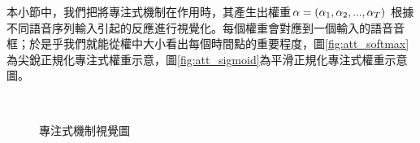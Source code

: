 \begin{itemize}
本小節中，我們把將專注式機制在作用時，其產生出權重$\bold{\alpha} =(
\alpha_1,\alpha_2,...,\alpha_T)$
根據不同語音序列輸入引起的反應進行視覺化。每個權重會對應到一個輸入的語音音框；於是乎我們就能從權中大小看出每個時間點的重要程度，圖\ref{fig:att_softmax}為尖銳正規化專注式權重示意，圖\ref{fig:att_sigmoid}為平滑正規化專注式權重示意圖。
\begin{figure}[h]
\centering
{}
\\
\caption{專注式機制視覺圖}
\end{figure}

\end{itemize}
